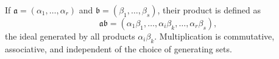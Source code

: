 If $\mathfrak{a} = (\alpha_1, \ldots, \alpha_r)$ and $\mathfrak{b} = (\beta_1, \ldots, \beta_s)$, their product is defined as
$$\mathfrak{a}\mathfrak{b} = (\alpha_1\beta_1, \ldots, \alpha_i\beta_k, \ldots, \alpha_r\beta_s),$$
the ideal generated by all products $\alpha_i\beta_k$. Multiplication is commutative, associative, and independent of the choice of generating sets.
